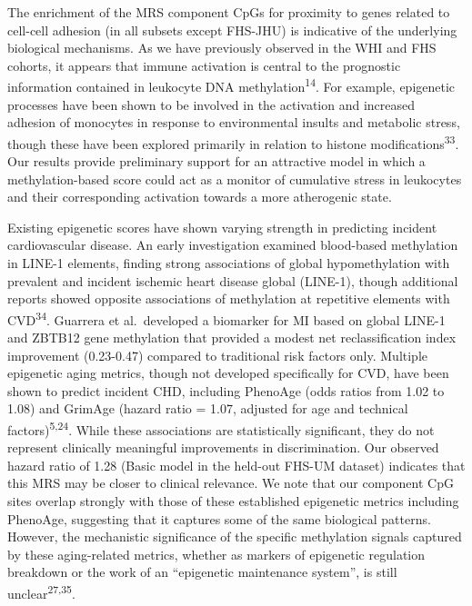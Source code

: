 \documentclass[]{article}
\begin{document}
The enrichment of the MRS component CpGs for proximity to genes related
to cell-cell adhesion (in all subsets except FHS-JHU) is indicative of
the underlying biological mechanisms. As we have previously observed in
the WHI and FHS cohorts, it appears that immune activation is central to
the prognostic information contained in leukocyte DNA
methylation\textsuperscript{14}. For example, epigenetic processes have
been shown to be involved in the activation and increased adhesion of
monocytes in response to environmental insults and metabolic stress,
though these have been explored primarily in relation to histone
modifications\textsuperscript{33}. Our results provide preliminary
support for an attractive model in which a methylation-based score could
act as a monitor of cumulative stress in leukocytes and their
corresponding activation towards a more atherogenic state.

Existing epigenetic scores have shown varying strength in predicting
incident cardiovascular disease. An early investigation examined
blood-based methylation in LINE-1 elements, finding strong associations
of global hypomethylation with prevalent and incident ischemic heart
disease global (LINE-1), though additional reports showed opposite
associations of methylation at repetitive elements with
CVD\textsuperscript{34}. Guarrera et al.~developed a biomarker for MI
based on global LINE-1 and ZBTB12 gene methylation that provided a
modest net reclassification index improvement (0.23-0.47) compared to
traditional risk factors only. Multiple epigenetic aging metrics, though
not developed specifically for CVD, have been shown to predict incident
CHD, including PhenoAge (odds ratios from 1.02 to 1.08) and GrimAge
(hazard ratio = 1.07, adjusted for age and technical
factors)\textsuperscript{5,24}. While these associations are
statistically significant, they do not represent clinically meaningful
improvements in discrimination. Our observed hazard ratio of 1.28 (Basic
model in the held-out FHS-UM dataset) indicates that this MRS may be
closer to clinical relevance. We note that our component CpG sites
overlap strongly with those of these established epigenetic metrics
including PhenoAge, suggesting that it captures some of the same
biological patterns. However, the mechanistic significance of the
specific methylation signals captured by these aging-related metrics,
whether as markers of epigenetic regulation breakdown or the work of an
``epigenetic maintenance system'', is still
unclear\textsuperscript{27,35}.
\end{document}

